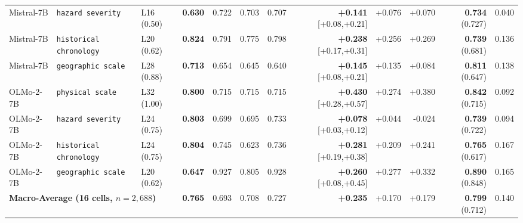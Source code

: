 \documentclass[10pt]{article}
\begin{document}
\begin{table}[t]
{\begin{tabular}{lllrrrrrrrrr}
    Mistral-7B & \texttt{hazard severity} & L16 (0.50) & \textbf{0.630} & 0.722 & 0.703 & 0.707 & \textbf{+0.141} [+0.08,+0.21] & +0.076 & +0.070 & \textbf{0.734} (0.727) & 0.040 \\
    Mistral-7B & \texttt{historical chronology} & L20 (0.62) & \textbf{0.824} & 0.791 & 0.775 & 0.798 & \textbf{+0.238} [+0.17,+0.31] & +0.256 & +0.269 & \textbf{0.739} (0.681) & 0.136 \\
    Mistral-7B & \texttt{geographic scale} & L28 (0.88) & \textbf{0.713} & 0.654 & 0.645 & 0.640 & \textbf{+0.145} [+0.08,+0.21] & +0.135 & +0.084 & \textbf{0.811} (0.647) & 0.138 \\
    \midrule
    OLMo-2-7B & \texttt{physical scale} & L32 (1.00) & \textbf{0.800} & 0.715 & 0.715 & 0.715 & \textbf{+0.430} [+0.28,+0.57] & +0.274 & +0.380 & \textbf{0.842} (0.715) & 0.092 \\
    OLMo-2-7B & \texttt{hazard severity} & L24 (0.75) & \textbf{0.803} & 0.699 & 0.695 & 0.733 & \textbf{+0.078} [+0.03,+0.12] & +0.044 & -0.024 & \textbf{0.739} (0.722) & 0.094 \\
    OLMo-2-7B & \texttt{historical chronology} & L24 (0.75) & \textbf{0.804} & 0.745 & 0.623 & 0.736 & \textbf{+0.281} [+0.19,+0.38] & +0.209 & +0.241 & \textbf{0.765} (0.617) & 0.167 \\
    OLMo-2-7B & \texttt{geographic scale} & L20 (0.62) & \textbf{0.647} & 0.927 & 0.805 & 0.928 & \textbf{+0.260} [+0.08,+0.45] & +0.277 & +0.332 & \textbf{0.890} (0.848) & 0.165 \\
    \midrule
    \multicolumn{3}{l}{\textbf{Macro-Average (16 cells, $n=2,688$)}} & \textbf{0.765} & 0.693 & 0.708 & 0.727 & \textbf{+0.235} & +0.170 & +0.179 & \textbf{0.799} (0.712) & 0.140 \\
    \bottomrule
  \end{tabular}}
\end{table}

\begin{table}[t]
  \centering
  \caption{Mid-depth ablation across all four models: ACE subspace rank ($1, 2, 4$) and Tuned Lens ridge regularization ($\alpha \in \{10, 100, 1000\}$).}
  \label{tab:steer_ablation}
  \scriptsize
\end{table}
\end{document}
